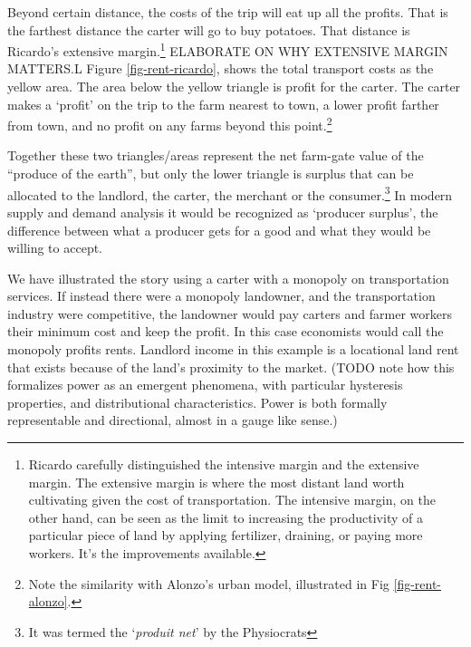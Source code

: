 Beyond certain distance, the costs of the trip will eat up all the profits. That is the farthest distance the carter will go to buy potatoes. That distance is Ricardo's \gls{extensive margin}.\footnote{Ricardo carefully distinguished the \gls{intensive margin} and the \gls{extensive margin}. The extensive margin is where the most distant land worth cultivating given the cost of transportation. The intensive margin, on the other hand, can be seen as the limit to increasing the productivity  of a particular piece of land by applying fertilizer, draining, or paying more workers. It's the improvements available.} %
ELABORATE ON WHY EXTENSIVE MARGIN MATTERS.L
Figure \ref{fig-rent-ricardo}, shows the total transport costs as the yellow area. The area below the yellow triangle is profit for the carter. The carter makes a `profit' on the trip to the farm nearest to town, a lower profit farther from town, and no profit on any farms beyond this point.\footnote{Note the similarity with Alonzo's urban model, illustrated in Fig \ref{fig-rent-alonzo}.}

Together these two triangles/areas represent the net farm-gate value of the ``produce of the earth'', but only the lower triangle is surplus that can be allocated to the landlord, the carter, the merchant or the consumer.\footnote{It was termed the `\textit{produit net}' by the Physiocrats} In modern supply and demand analysis it would be recognized as `producer surplus', the difference between what a producer gets for a good and what they would be willing to accept.

We have illustrated the story using a carter with a monopoly on transportation services. If instead there were a monopoly landowner, and the transportation industry were competitive, the landowner would pay carters and farmer workers their minimum cost and keep the profit. In this case economists would call the monopoly profits rents. %
Landlord income in this example is a locational \gls{land rent} that exists because of the land's proximity to the market.  
(TODO note how this formalizes power as an  emergent phenomena, with particular hysteresis properties, and distributional characteristics. Power is both formally representable and directional, almost in a gauge like sense.)

